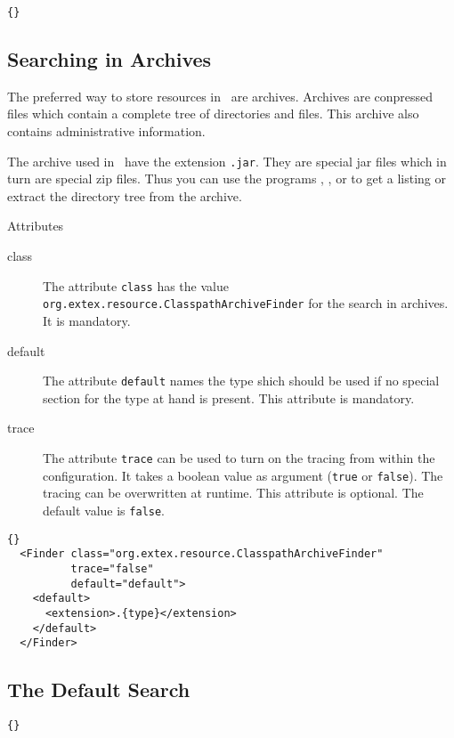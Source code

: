 \begin{lstlisting}{}
\end{lstlisting}

\INCOMPLETE

\subsection{Searching in Archives}

The preferred way to store resources in \ExTeX\ are archives. Archives
are conpressed files which contain a complete tree of directories and
files. This archive also contains administrative information.

The archive used in \ExTeX\ have the extension \texttt{.jar}. They are
special jar files which in turn are special zip files. Thus you can
use the programs , , or  to get a
listing or extract the directory tree from the archive.

Attributes
\begin{description}
\item[class] The attribute \texttt{class} has the value
  \texttt{org.extex.resource.ClasspathArchiveFinder} for the search in
  archives. It is mandatory.
\item[default] The attribute \texttt{default} names the type shich
  should be used if no special section for the type at hand is
  present. This attribute is mandatory.
\item[trace] The attribute \texttt{trace} can be used to turn on the
  tracing from within the configuration. It takes a boolean value as
  argument (\texttt{true} or \texttt{false}). The tracing can be
  overwritten at runtime. This attribute is optional. The default
  value is \texttt{false}.
\end{description}

\begin{lstlisting}{}
  <Finder class="org.extex.resource.ClasspathArchiveFinder"
          trace="false"
          default="default">
    <default>
      <extension>.{type}</extension>
    </default>
  </Finder>
\end{lstlisting}

\INCOMPLETE

\subsection{The Default Search}

\INCOMPLETE

\begin{lstlisting}{}
\end{lstlisting}

